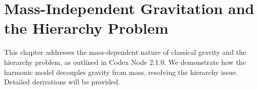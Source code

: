 \section{Mass-Independent Gravitation and the Hierarchy Problem}
This chapter addresses the mass-dependent nature of classical gravity and the hierarchy problem, as outlined in Codex Node 2.1.0. We demonstrate how the harmonic model decouples gravity from mass, resolving the hierarchy issue. Detailed derivations will be provided.